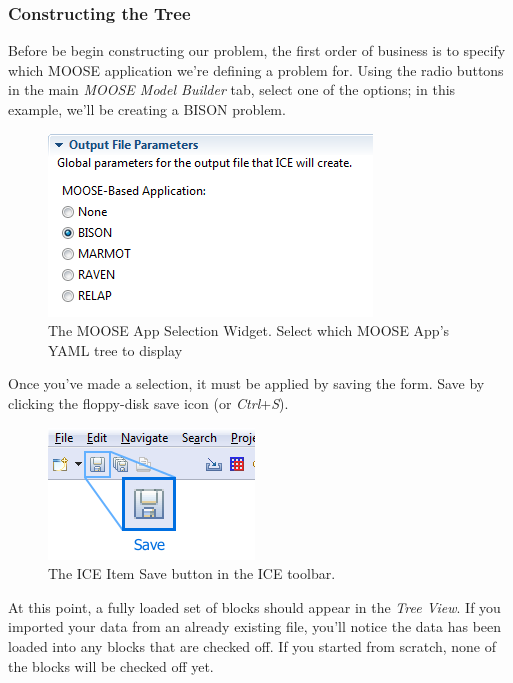 \subsubsection{Constructing the Tree}\label{constructing-the-tree}

Before be begin constructing our problem, the first order of business is
to specify which MOOSE application we're defining a problem for. Using
the radio buttons in the main \emph{MOOSE Model Builder} tab, select one
of the options; in this example, we'll be creating a BISON problem.

\begin{figure}[htbp]
\centering
\includegraphics{figures/ICE_SelectMOOSEApp.png}
\caption{The MOOSE App Selection Widget. Select which MOOSE App's YAML tree to display}
\end{figure}

Once you've made a selection, it must be applied by saving the form.
Save by clicking the floppy-disk save icon (or \emph{Ctrl}+\emph{S}).

\begin{figure}[htbp]
\centering
\includegraphics{figures/ICE_SaveButton.png}
\caption{The ICE Item Save button in the ICE toolbar.}
\end{figure}

At this point, a fully loaded set of blocks should appear in the
\emph{Tree View}. If you imported your data from an already existing
file, you'll notice the data has been loaded into any blocks that are
checked off. If you started from scratch, none of the blocks will be
checked off yet.

